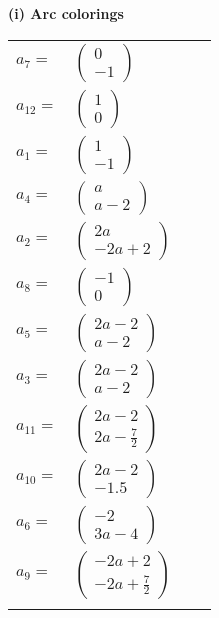 \documentclass[1p]{elsarticle_modified}
\theoremstyle{definition}
\begin{document}
\flushleft \textbf{(i) Arc colorings}\\
\begin{tabular}{m{7pt} m{180pt} m{7pt} m{180pt} }
\flushright $a_{7}=$&$\begin{pmatrix}0\\-1\end{pmatrix}$ \\
\flushright $a_{12}=$&$\begin{pmatrix}1\\0\end{pmatrix}$ \\
\flushright $a_{1}=$&$\begin{pmatrix}1\\-1\end{pmatrix}$ \\
\flushright $a_{4}=$&$\begin{pmatrix}a\\a-2\end{pmatrix}$ \\
\flushright $a_{2}=$&$\begin{pmatrix}2 a\\-2 a+2\end{pmatrix}$ \\
\flushright $a_{8}=$&$\begin{pmatrix}-1\\0\end{pmatrix}$ \\
\flushright $a_{5}=$&$\begin{pmatrix}2 a-2\\a-2\end{pmatrix}$ \\
\flushright $a_{3}=$&$\begin{pmatrix}2 a-2\\a-2\end{pmatrix}$ \\
\flushright $a_{11}=$&$\begin{pmatrix}2 a-2\\2 a-\frac{7}{2}\end{pmatrix}$ \\
\flushright $a_{10}=$&$\begin{pmatrix}2 a-2\\-1.5\end{pmatrix}$ \\
\flushright $a_{6}=$&$\begin{pmatrix}-2\\3 a-4\end{pmatrix}$ \\
\flushright $a_{9}=$&$\begin{pmatrix}-2 a+2\\-2 a+\frac{7}{2}\end{pmatrix}$\\&\end{tabular}
\end{document}
